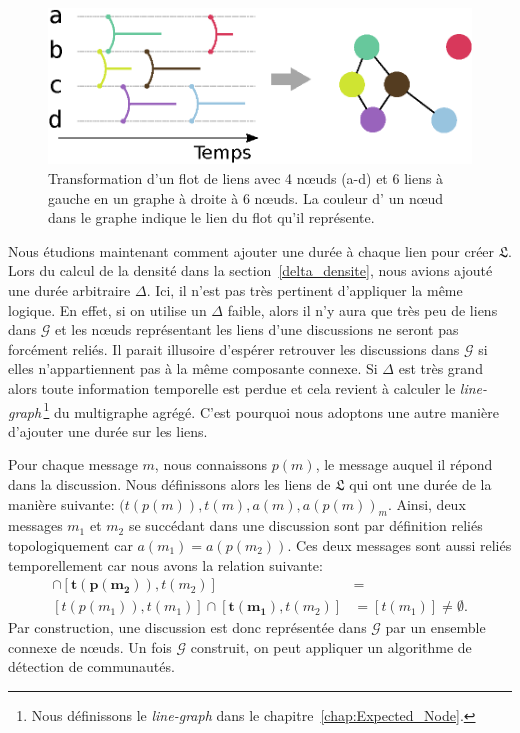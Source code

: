 \begin{figure}[h]
\centering
\includegraphics[width=0.55\linewidth]{img/mailing/Transformation.eps}
\caption{Transformation d'un flot de liens avec 4 n\oe{}uds (a-d) et 6 liens à gauche en un graphe à droite à 6 n\oe{}uds. La couleur d' un n\oe{}ud dans le graphe indique le lien du flot qu'il représente.}
\label{fig:Transformation}
\end{figure}%

Nous étudions maintenant comment ajouter une durée à chaque lien pour créer $\mathfrak{L}$.
Lors du calcul de la densité dans la section~\ref{delta_densite}, nous avions ajouté une durée arbitraire $\Delta$.
Ici, il n'est pas très pertinent d'appliquer la même logique.
En effet, si on utilise un $\Delta$ faible, alors il n'y aura que très peu de liens dans $\mathcal{G}$ et les n\oe{}uds représentant les liens d'une discussions ne seront pas forcément reliés.
Il parait illusoire d'espérer retrouver les discussions dans $\mathcal{G}$ si elles n'appartiennent pas à la même composante connexe.
Si $\Delta$ est très grand alors toute information temporelle est perdue et cela revient à calculer le \emph{line-graph}\,\footnote{Nous définissons le \emph{line-graph} dans le chapitre~\ref{chap:Expected_Node}.} du multigraphe agrégé.
C'est pourquoi nous adoptons une autre manière d'ajouter une durée sur les liens.

Pour chaque message $m$, nous connaissons $p(m)$, le message auquel il répond dans la discussion.
Nous définissons alors les liens de $\mathfrak{L}$ qui ont une durée de la manière suivante: ${(t(p(m)),t(m),a(m),a(p(m))}_m$.
Ainsi, deux messages $m_1$ et $m_2$ se succédant dans une discussion sont par définition reliés topologiquement car $a(m_1)= a(p(m_2))$.
Ces deux messages sont aussi reliés temporellement car nous avons la relation suivante:
\begin{align*}
[t(p(m_1)),t(m_1)]\cap [\mathbf{t(p(m_2))},t(m_2)] &= \\
[t(p(m_1)),t(m_1)]\cap [\mathbf{t(m_1)},t(m_2)] &= [t(m_1)] \neq \emptyset.
\end{align*}
Par construction, une discussion est donc représentée dans $\mathcal{G}$ par un ensemble connexe de n\oe{}uds.
Un fois $\mathcal{G}$ construit, on peut appliquer un algorithme de détection de communautés.

